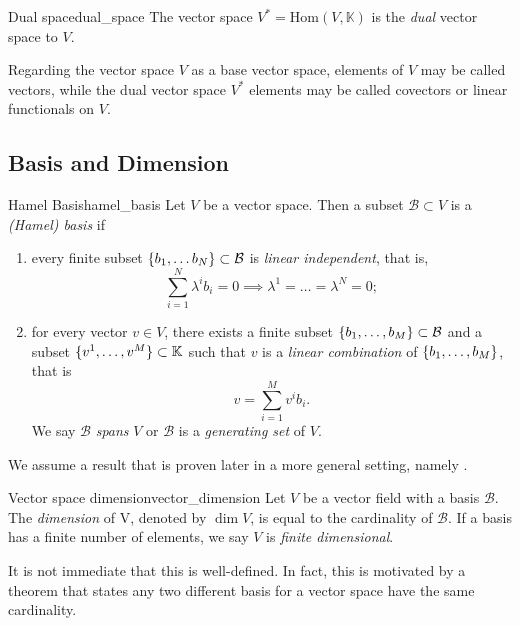 \begin{definition}{Dual space}{dual_space}
    The vector space \(V^\ast = \mathrm{Hom}(V, \mathbb{K})\) is the \emph{dual} vector space to \(V\).
\end{definition}
\begin{remark}
    Regarding the vector space \(V\) as a base vector space, elements of \(V\) may be called vectors, while the dual vector space \(V ^{\ast}\) elements may be called covectors or linear functionals on \(V\).
\end{remark}

\subsection{Basis and Dimension}

\begin{definition}{Hamel Basis}{hamel_basis}
    Let \(V\) be a vector space. Then a subset \(\mathcal{B} \subset V\) is a \emph{(Hamel) basis} if
    \begin{enumerate}[label=(\alph*)]
        \item every finite subset \(\{b_1, \dots b_N\} \subset \mathcal{B}\) is \emph{linear independent}, that is,
            \begin{equation*}
                \sum_{i = 1}^N \lambda^i b_i = 0 \implies \lambda^1 = \dots = \lambda^N = 0;
            \end{equation*}
        \item for every vector \(v \in V\), there exists a finite subset \(\{b_1, \dots, b_M\} \subset \mathcal{B}\) and a subset \(\{v^1, \dots, v^M\} \subset \mathbb{K}\) such that \(v\) is a \emph{linear combination} of \(\{b_1, \dots, b_M\}\), that is
        \begin{equation*}
            v = \sum_{i=1}^M v^ib_i.
        \end{equation*}
        We say \(\mathcal{B}\) \emph{spans} \(V\) or \(\mathcal{B}\) is a \emph{generating set} of \(V\).
    \end{enumerate}
\end{definition}

We assume a result that is proven later in a more general setting, namely .

\begin{definition}{Vector space dimension}{vector_dimension}
    Let \(V\) be a vector field with a basis \(\mathcal{B}\). The \emph{dimension} of V, denoted by \(\dim{V}\), is equal to the cardinality of \(\mathcal{B}\). If a basis has a finite number of elements, we say \(V\) is \emph{finite dimensional}.
\end{definition}
\begin{remark}
    It is not immediate that this is well-defined. In fact, this is motivated by a theorem that  states any two different basis for a vector space have the same cardinality.
\end{remark}

